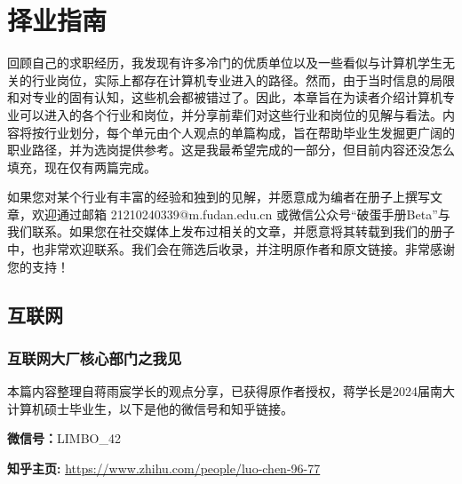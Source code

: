 \chapter{择业指南}

回顾自己的求职经历，我发现有许多冷门的优质单位以及一些看似与计算机学生无关的行业岗位，实际上都存在计算机专业进入的路径。然而，由于当时信息的局限和对专业的固有认知，这些机会都被错过了。因此，本章旨在为读者介绍计算机专业可以进入的各个行业和岗位，并分享前辈们对这些行业和岗位的见解与看法。内容将按行业划分，每个单元由个人观点的单篇构成，旨在帮助毕业生发掘更广阔的职业路径，并为选岗提供参考。这是我最希望完成的一部分，但目前内容还没怎么填充，现在仅有两篇完成。

如果您对某个行业有丰富的经验和独到的见解，并愿意成为编者在册子上撰写文章，欢迎通过邮箱 21210240339@m.fudan.edu.cn 或微信公众号“破蛋手册Beta”与我们联系。如果您在社交媒体上发布过相关的文章，并愿意将其转载到我们的册子中，也非常欢迎联系。我们会在筛选后收录，并注明原作者和原文链接。非常感谢您的支持！




\section{互联网}
\subsection{互联网大厂核心部门之我见}

本篇内容整理自蒋雨宸学长的观点分享，已获得原作者授权，蒋学长是2024届南大计算机硕士毕业生，以下是他的微信号和知乎链接。

\textbf{微信号：}LIMBO\_42

\textbf{知乎主页: }\url{https://www.zhihu.com/people/luo-chen-96-77}
